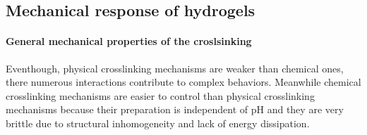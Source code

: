 \subsection{Mechanical response of hydrogels}\label{ch1:Cross-linking}

\paragraph{General mechanical properties of the croslsinking}
Eventhough, physical crosslinking mechanisms are weaker than chemical ones, there numerous interactions contribute to complex behaviors.
Meanwhile chemical crosslinking mechanisms are easier to control than physical crosslinking mechanisms because their preparation is independent of pH\citep{bustamante-torresHydrogelsClassificationAccording2021} and they are very brittle due to structural inhomogeneity and lack of energy dissipation\citep{xuRoleChemicalPhysical2018}.


